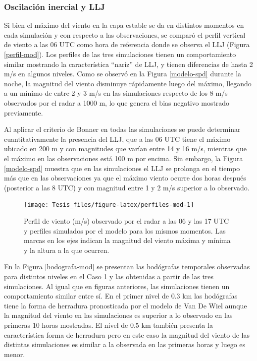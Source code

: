 \documentclass[12pt,spanish,oneside, a4paper]{book}
\begin{document}
\subsubsection{Oscilación inercial y
LLJ}\label{oscilacion-inercial-y-llj-1}

Si bien el máximo del viento en la capa estable se da en distintos
momentos en cada simulación y con respecto a las observaciones, se
comparó el perfil vertical de viento a las 06 UTC como hora de
referencia donde se observa el LLJ (Figura \ref{perfil-mod}). Los
perfiles de las tres simulaciones tienen un comportamiento similar
mostrando la característica ``nariz'' de LLJ, y tienen diferencias de
hasta 2 m/s en algunos niveles. Como se observó en la Figura
\ref{modelo-spd} durante la noche, la magnitud del viento disminuye
rápidamente luego del máximo, llegando a un mínimo de entre 2 y 3 m/s en
las simulaciones respecto de los 8 m/s observados por el radar a 1000 m,
lo que genera el bias negativo mostrado previamente.

Al aplicar el criterio de Bonner en todas las simulaciones se puede
determinar cuantitativamente la presencia del LLJ, que a las 06 UTC
tiene el máximo ubicado en 200 m y con magnitudes que varían entre 14 y
16 m/s, mientras que el máximo en las observaciones está 100 m por
encima. Sin embargo, la Figura \ref{modelo-spd} muestra que en las
simulaciones el LLJ se prolonga en el tiempo más que en las
observaciones ya que el máximo viento ocurre dos horas después
(posterior a las 8 UTC) y con magnitud entre 1 y 2 m/s superior a lo
observado.

\begin{figure}

{\centering \texttt{[image: Tesis\_files/figure-latex/perfiles-mod-1]} 

}

\caption{Perfil de viento (m/s) observado por el radar a las 06 y las 17 UTC y perfiles simulados por el modelo para los mismos momentos. Las marcas en los ejes indican la magnitud del viento máxima y mínima y la altura a la que ocurren. \label{perfil-mod}}\label{fig:perfiles-mod}
\end{figure}

En la Figura \ref{hodografa-mod} se presentan las hodógrafas temporales
observadas para distintos niveles en el Caso 1 y las obtenidas a partir
de las tres simulaciones. Al igual que en figuras anteriores, las
simulaciones tienen un comportamiento similar entre sí. En el primer
nivel de 0.3 km las hodógrafas tiene la forma de herradura pronosticada
por el modelo de Van De Wiel aunque la magnitud del viento en las
simulaciones es superior a lo observado en las primeras 10 horas
mostradas. El nivel de 0.5 km también presenta la característica forma
de herradura pero en este caso la magnitud del viento de las distintas
simulaciones es similar a la observada en las primeras horas y luego es
menor.
\end{document}
